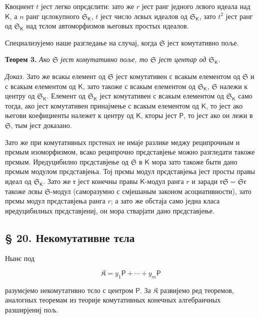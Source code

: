 \documentclass[11pt]{article}
\begin{document}
Квоциент \(t\) јест легко опрєдєлити: зато же \(r\) јест ранг једного лєвого идеала над \(\mathsf K\), а \(n\) ранг цєлокупного \(\mathfrak S_{\mathsf K}\), \(t\) јест число лєвых идеалов од \(\mathfrak S_{\mathsf K}\), зато \(t^2\) јест ранг од \(\mathfrak S_{\mathsf K}\) над тєлом автоморфизмов његовых простых идеалов.

Специализујемо наше разгледање на случај, когда \(\mathfrak S\) јест комутативно поље.

\textbf{Теорем 3.} \emph{Ако \(\mathfrak S\) јест комутативно поље, то \(\mathfrak S\) јест центар од \(\mathfrak S_{\mathsf K}\).}

\emph{Доказ.} Зато же всакы елемент од \(\mathfrak S\) јест комутативен с всакым елементом од \(\mathfrak S\) и с всакым елементом од \(\mathsf K\), зато такоже с всакым елементом од \(\mathfrak S_{\mathsf K}\), \(\mathfrak S\) належи к центру од \(\mathfrak S_{\mathsf K}\). Елемент од \(\mathfrak S_{\mathsf K}\) јест комутативен с всакым елементом од \(\mathfrak S_{\mathsf K}\) само тогда, ако јест комутативен принајмење с всакым елементом од \(\mathsf K\), то јест ако његови коефициенты належет к центру од \(\mathsf K\), кторы јест \(\mathsf P\), то јест ако он лежи в \(\mathfrak S\), тым јест доказано.

Зато же при комутативных прстенах не имаје разлике меджу реципрочным и прємым изоморфизмом, всако реципрочно прєдставјење можно разгледати такоже прємым. Иредуцибилно прєдставјење од \(\mathfrak S\) в \(\mathsf K\) мора зато такоже быти дано прємым модулом прєдставјења. Тој прємы модул прєдставјења јест просты правы идеал од \(\mathfrak S_{\mathsf K}\). Зато же \(\mathfrak r\) јест конечны правы \(\mathsf K\)-модул ранга \(r\) и заради \(\mathfrak r\mathfrak S=\mathfrak S\mathfrak r\) такоже лєвы \(\mathfrak S\)-модул (саморазумно с смјешаным законом асоциативности), зато прємы модул прєдставјења ранга \(r\); а зато же обстаја само једна класа иредуцибилных прєдставјениј, он мора стварјати дано прєдставјење.

\subsection*{§ 20. Некомутативне тєла}\label{nichtkommutative-koerper}

Нынє под

\[
\mathfrak K=y_1\mathsf P+\cdots+y_m\mathsf P
\]

разумєјемо некомутативно тєло с центром \(\mathsf P\). За \(\mathfrak K\) развијемо ред теоремов, аналогных теоремам из теорије комутативных конечных алгебраичных разширјениј пољ.
\end{document}
